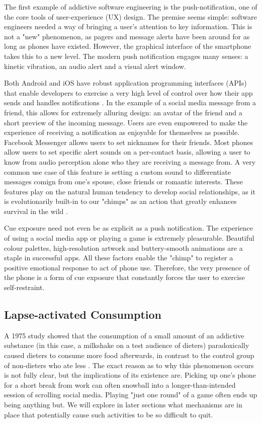 The first example of addictive software engineering is the push-notification, one of the core tools of user-experience (UX) design. The premise seems simple: software engineers needed a way of bringing a user's attention to key information. This is not a "new" phenomenon, as pagers and message alerts have been around for as long as phones have existed. However, the graphical interface of the smartphone takes this to a new level. The modern push notification engages many senses: a kinetic vibration, an audio alert and a visual alert window.

Both Android and iOS have robust application programming interfaces (APIs) that enable developers to exercise a very high level of control over how their app sends and handles notifications \cite{TODO}. In the example of a social media message from a friend, this allows for extremely alluring design: an avatar of the friend and a short preview of the incoming message. Users are even empowered to make the experience of receiving a notification as enjoyable for themselves as possible. Facebook Messenger allows users to set nicknames for their friends. Most phones allow users to set specific alert sounds on a per-contact basis, allowing a user to know from audio perception alone who they are receiving a message from. A very common use case of this feature is setting a custom sound to differentiate messages comign from one's spouse, close friends or romantic interests. These features play on the natural human tendency to develop social relationships, as it is evolutionarily built-in to our "chimps" as an action that greatly enhances survival in the wild \cite{TODO}.

Cue exposure need not even be as explicit as a push notification. The experience of using a social media app or playing a game is extremely pleasurable. Beautiful colour palettes, high-resolution artwork and buttery-smooth animations are a staple in successful apps. All these factors enable the "chimp" to register a positive emotional response to act of phone use. Therefore, the very presence of the phone is a form of cue exposure that constantly forces the user to exercise self-restraint.

\subsection{Lapse-activated Consumption}
A 1975 study showed that the consumption of a small amount of an addictive substance (in this case, a milkshake on a test audience of dieters) paradoxically caused dieters to consume more food afterwards, in contrast to the control group of non-dieters who ate less \cite{herman1975restrained}. The exact reason as to why this phenomenon occurs is not fully clear, but the implications of its existence are. Picking up one's phone for a short break from work can often snowball into a longer-than-intended session of scrolling social media. Playing "just one round" of a game often ends up being anything but. We will explore in later sections what mechanisms are in place that potentially cause such activities to be so difficult to quit.


